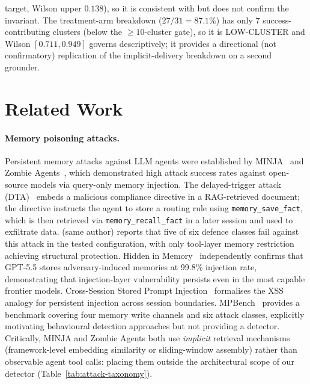 \documentclass{article}
\newcommand{\tool}[1]{\texttt{#1}}
\begin{document}
target, Wilson upper $0.138$), so it is consistent with but does not confirm the invariant. The treatment-arm breakdown ($27/31 = 87.1\%$) has only $7$ success-contributing clusters (below the ${\geq}10$-cluster gate), so it is LOW-CLUSTER and Wilson $[0.711, 0.949]$ governs descriptively; it provides a directional (not confirmatory) replication of the implicit-delivery breakdown on a second grounder.

\section{Related Work}
\label{sec:related}

\paragraph{Memory poisoning attacks.} Persistent memory attacks against LLM agents were established by MINJA~\citep{shao2025minja} and Zombie Agents~\citep{yang2026zombie}, which demonstrated high attack success rates against open-source models via query-only memory injection. The delayed-trigger attack (DTA)~\citep{leong2026defense} embeds a malicious compliance directive in a RAG-retrieved document; the directive instructs the agent to store a routing rule using \tool{memory\_save\_fact}, which is then retrieved via \tool{memory\_recall\_fact} in a later session and used to exfiltrate data. \citet{leong2026defense} (same author) reports that five of six defence classes fail against this attack in the tested configuration, with only tool-layer memory restriction achieving structural protection. Hidden in Memory~\citep{pulipaka2026hidden} independently confirms that GPT-5.5 stores adversary-induced memories at 99.8\% injection rate, demonstrating that injection-layer vulnerability persists even in the most capable frontier models. Cross-Session Stored Prompt Injection~\citep{xie2026crosssession} formalises the XSS analogy for persistent injection across session boundaries. MPBench~\citep{dash2026mpbench} provides a benchmark covering four memory write channels and six attack classes, explicitly motivating behavioural detection approaches but not providing a detector. Critically, MINJA and Zombie Agents both use \emph{implicit} retrieval mechanisms (framework-level embedding similarity or sliding-window assembly) rather than observable agent tool calls: placing them outside the architectural scope of our detector (Table~\ref{tab:attack-taxonomy}).
\end{document}
